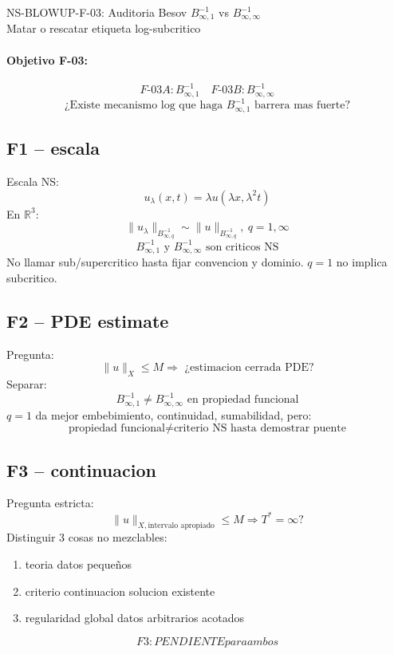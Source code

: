 \documentclass[11pt]{article}
\begin{document}
\begin{center}
{\Large NS-BLOWUP-F-03: Auditoria Besov $B^{-1}_{\infty,1}$ vs $B^{-1}_{\infty,\infty}$}\\
Matar o rescatar etiqueta log-subcritico
\end{center}

\paragraph{Objetivo F-03:}
\[
\boxed{F\text{-}03A: B^{-1}_{\infty,1}\quad F\text{-}03B: B^{-1}_{\infty,\infty}}
\]
\[
\boxed{\text{¿Existe mecanismo log que haga }B^{-1}_{\infty,1}\text{ barrera mas fuerte?}}
\]

\subsection*{F1 -- escala}
Escala NS:
\[
u_\lambda(x,t)=\lambda u(\lambda x,\lambda^2 t)
\]
En $\mathbb R^3$:
\[
\boxed{\|u_\lambda\|_{B^{-1}_{\infty,q}}\sim\|u\|_{B^{-1}_{\infty,q}},\ q=1,\infty}
\]
\[
\boxed{B^{-1}_{\infty,1}\text{ y }B^{-1}_{\infty,\infty}\text{ son criticos NS}}
\]
No llamar sub/supercritico hasta fijar convencion y dominio. $q=1$ no implica subcritico.

\subsection*{F2 -- PDE estimate}
Pregunta:
\[
\|u\|_X\le M\Rightarrow\text{ ¿estimacion cerrada PDE?}
\]
Separar:
\[
\boxed{B^{-1}_{\infty,1}\neq B^{-1}_{\infty,\infty}\text{ en propiedad funcional}}
\]
$q=1$ da mejor embebimiento, continuidad, sumabilidad, pero:
\[
\boxed{\text{propiedad funcional}\neq\text{criterio NS hasta demostrar puente}}
\]

\subsection*{F3 -- continuacion}
Pregunta estricta:
\[
\boxed{\|u\|_{X,\text{intervalo apropiado}}\le M\Rightarrow T^*=\infty?}
\]
Distinguir 3 cosas no mezclables:
\begin{enumerate}
\item teoria datos peque\~nos
\item criterio continuacion solucion existente
\item regularidad global datos arbitrarios acotados
\end{enumerate}
\[
\boxed{F3: PENDIENTE para ambos}
\]
\end{document}
